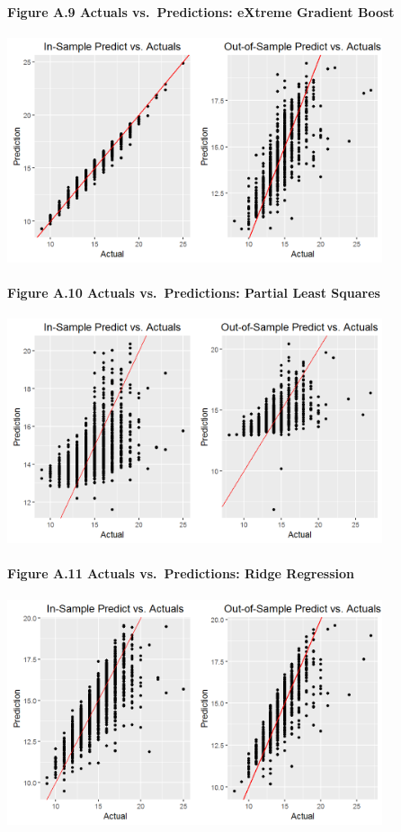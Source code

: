 \documentclass[]{article}
\let\oldparagraph\paragraph
\renewcommand{\paragraph}[1]{\oldparagraph{#1}\mbox{}}
\begin{document}
\paragraph{Figure A.9 Actuals vs.~Predictions: eXtreme Gradient
Boost}\label{figure-a.9-actuals-vs.predictions-extreme-gradient-boost}

\includegraphics[height=2.60417in]{images/amt_xgb_sample_pred.png}

\newpage

\paragraph{Figure A.10 Actuals vs.~Predictions: Partial Least
Squares}\label{figure-a.10-actuals-vs.predictions-partial-least-squares}

\includegraphics[height=2.60417in]{images/amt_pls_sample_pred.png}

\paragraph{Figure A.11 Actuals vs.~Predictions: Ridge
Regression}\label{figure-a.11-actuals-vs.predictions-ridge-regression}

\includegraphics[height=2.60417in]{images/amt_rr_sample_pred.png}
\end{document}
